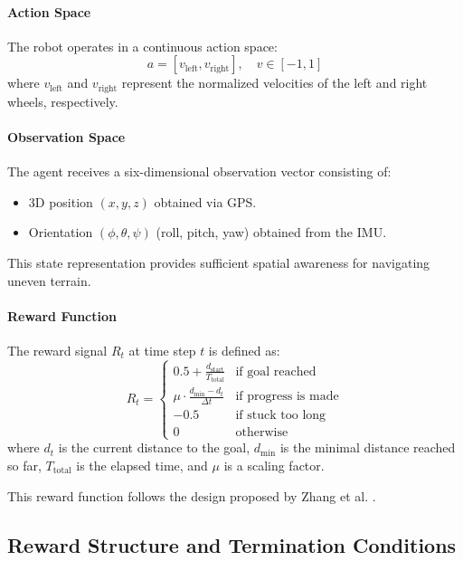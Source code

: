 \documentclass[11pt,twocolumn]{article}
\begin{document}
\paragraph{Action Space}

The robot operates in a continuous action space:
\[
a = [v_{\text{left}}, v_{\text{right}}], \quad v \in [-1, 1]
\]
where $v_{\text{left}}$ and $v_{\text{right}}$ represent the normalized velocities of the left and right wheels, respectively.

\paragraph{Observation Space}

The agent receives a six-dimensional observation vector consisting of:

\begin{itemize}
    \item 3D position $(x, y, z)$ obtained via GPS.
    \item Orientation $(\phi, \theta, \psi)$ (roll, pitch, yaw) obtained from the IMU.
\end{itemize}

This state representation provides sufficient spatial awareness for navigating uneven terrain.

\paragraph{Reward Function}

The reward signal \( R_t \) at time step \( t \) is defined as:
\[
R_t = 
\begin{cases}
0.5 + \frac{d_{\text{start}}}{T_{\text{total}}} & \text{if goal reached} \\
\mu \cdot \frac{d_{\min} - d_t}{\Delta t} & \text{if progress is made} \\
-0.5 & \text{if stuck too long} \\
0 & \text{otherwise}
\end{cases}
\]
where \( d_t \) is the current distance to the goal, \( d_{\min} \) is the minimal distance reached so far, \( T_{\text{total}} \) is the elapsed time, and \( \mu \) is a scaling factor.

This reward function follows the design proposed by Zhang et al. \cite{Zhang2018DRL}.

\subsection{Reward Structure and Termination Conditions}
\end{document}
